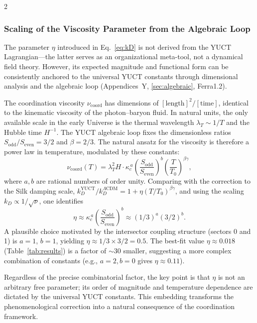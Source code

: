 \documentclass[11pt,a4paper]{article}
\begin{document}
\begin{multicols}{2}
		\subsubsection{Scaling of the Viscosity Parameter from the Algebraic Loop}
		\label{subsubsec:viscosity_scaling}
		
		The parameter \(\eta\) introduced in Eq.~\eqref{eq:kD} is not derived from the YUCT Lagrangian---the latter serves as an organizational meta-tool, not a dynamical field theory. However, its expected magnitude and functional form can be consistently anchored to the universal YUCT constants through dimensional analysis and the algebraic loop (Appendices~Y, \ref{sec:algebraic}, Ferra1.2).
		
		The coordination viscosity \(\nu_{\mathrm{coord}}\) has dimensions of \([\mathrm{length}]^2/[\mathrm{time}]\), identical to the kinematic viscosity of the photon--baryon fluid. In natural units, the only available scale in the early Universe is the thermal wavelength \(\lambda_T \sim 1/T\) and the Hubble time \(H^{-1}\). The YUCT algebraic loop fixes the dimensionless ratios \(S_{\mathrm{odd}}/S_{\mathrm{even}} = 3/2\) and \(\beta = 2/3\). The natural ansatz for the viscosity is therefore a power law in temperature, modulated by these constants:
		\begin{equation}
			\nu_{\mathrm{coord}}(T) = \lambda_T^2 H \cdot \kappa_c^{\,a} \left(\frac{S_{\mathrm{odd}}}{S_{\mathrm{even}}}\right)^b \left(\frac{T}{T_0}\right)^{\beta\gamma},
		\end{equation}
		where \(a,b\) are rational numbers of order unity. Comparing with the correction to the Silk damping scale, \(k_D^{\mathrm{YUCT}}/k_D^{\Lambda\mathrm{CDM}} = 1 + \eta (T/T_0)^{\beta\gamma}\), and using the scaling \(k_D \propto 1/\sqrt{\nu}\), one identifies
		\begin{equation}
			\eta \approx \kappa_c^{\,a} \left(\frac{S_{\mathrm{odd}}}{S_{\mathrm{even}}}\right)^b \approx (1/3)^a (3/2)^b.
		\end{equation}
		A plausible choice motivated by the intersector coupling structure (sectors 0 and 1) is \(a=1\), \(b=1\), yielding \(\eta \approx 1/3 \times 3/2 = 0.5\). The best-fit value \(\eta \approx 0.018\) (Table~\ref{tab:results}) is a factor of \(\sim 30\) smaller, suggesting a more complex combination of constants (e.g., \(a=2, b=0\) gives \(\eta \approx 0.11\)). 
		
		Regardless of the precise combinatorial factor, the key point is that \(\eta\) is not an arbitrary free parameter; its order of magnitude and temperature dependence are dictated by the universal YUCT constants. This embedding transforms the phenomenological correction into a natural consequence of the coordination framework.
		

\end{multicols}
\end{document}
